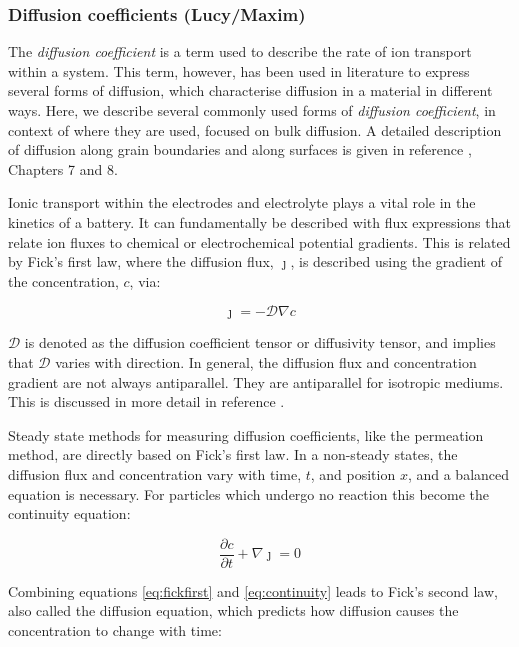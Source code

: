 \documentclass[../main.tex]{subfiles}
\begin{document}
\subsubsection{Diffusion coefficients (Lucy/Maxim)}
\label{sec:diffusion}

The \textit{diffusion coefficient} is a term used to describe the rate of ion transport within a system. This term, however, has been used in literature to express several forms of diffusion, which characterise diffusion in a material in different ways. Here, we describe several commonly used forms of \textit{diffusion coefficient}, in context of where they are used, focused on bulk diffusion. A detailed description of diffusion along grain boundaries and along surfaces is given in reference , Chapters 7 and 8.

Ionic transport within the electrodes and electrolyte plays a vital role in the kinetics of a battery. It can fundamentally be described with flux expressions that relate ion fluxes to chemical or electrochemical potential gradients. This is related by Fick's first law, where the diffusion flux, $\boldsymbol{\jmath}$, is described using the gradient of the concentration, $c$, via:

\begin{equation}
    \boldsymbol{\jmath} = - \mathcal{D} \nabla c
    \label{eq:fickfirst}
\end{equation}

$\mathcal{D}$ is denoted as the diffusion coefficient tensor or diffusivity tensor, and implies that $\mathcal{D}$ varies with direction. In general, the diffusion flux and concentration gradient are not always antiparallel. They are antiparallel for isotropic mediums. This is discussed in more detail in reference .

Steady state methods for measuring diffusion coefficients, like the permeation method, \cite{heumann2013diffusion} are directly based on Fick's first law. In a non-steady states, the diffusion flux and concentration vary with time, $t$, and position $x$, and a balanced equation is necessary. For particles which undergo no reaction this become the continuity equation:

\begin{equation}
    \frac{\partial c}{\partial t} + \nabla {\boldsymbol{\jmath}} = 0
    \label{eq:continuity}
\end{equation}

Combining equations \ref{eq:fickfirst} and \ref{eq:continuity} leads to Fick's second law, also called the diffusion equation, which predicts how diffusion causes the concentration to change with time:
\end{document}
